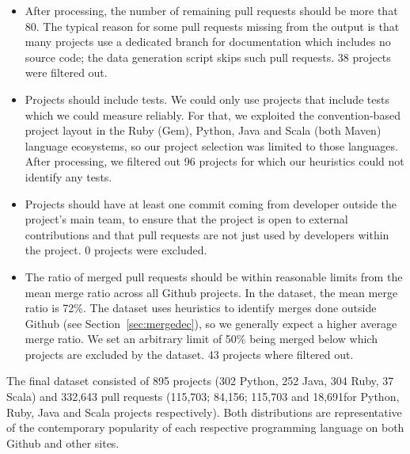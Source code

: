\documentclass{sig-alternate}
\begin{document}
\begin{itemize}

  \item After processing, the number of remaining pull requests should be more
    that 80. The typical reason for some pull requests missing from the output
    is that many projects use a dedicated branch for documentation which
    includes no source code; the data generation script skips such pull
    requests. 38 projects were filtered out.

  \item Projects should include tests. We could only use projects that include
    tests which we could measure reliably. For that, we exploited the
    convention-based project layout in the Ruby (Gem), Python, Java and Scala
    (both Maven) language ecosystems, so our project selection was limited to
    those languages. After processing, we filtered out 96 projects for which
    our heuristics could not identify any tests.

  \item Projects should have at least one commit coming from developer outside
    the project's main team, to ensure that the project is open to external
    contributions and that pull requests are not just used by developers within
    the project. 0 projects were excluded.

  \item The ratio of merged pull requests should be within reasonable limits
    from the mean merge ratio across all Github projects. In the \ghtorrent
    dataset, the mean merge ratio is 72\%. The \pullreqs dataset uses heuristics
    to identify merges done outside Github (see Section~\ref{sec:mergedec}), so
    we generally expect a higher average merge ratio. We set an arbitrary limit
    of 50\% being merged below which projects are excluded by the dataset. 43
    projects where filtered out.

\end{itemize}

The final dataset consisted of 895 projects (302 Python, 252 Java, 304 Ruby, 37
Scala) and 332,643 pull requests (115,703; 84,156; 115,703 and 18,691for Python,
Ruby, Java and Scala projects respectively). Both distributions are
representative of the contemporary popularity of each respective programming
language on both Github and other sites.

%
%
\end{document}
